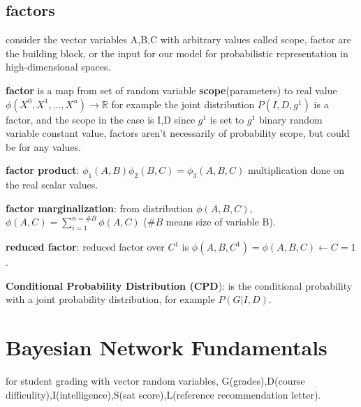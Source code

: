 \documentclass[4apaper,12pt]{book}
\begin{document}
\begin{description}
\begin{description}
      \subsection{factors}
      \begin{description}
      \item consider the vector variables A,B,C with arbitrary values called scope, factor are the building block, or the input for our model for probabilistic representation in high-dimensional spaces.
      \item \textbf{factor} is a map from set of random variable \textbf{scope}(parameters) to real value $\phi(X^0,X^1,...,X^n) \rightarrow \mathbb{R}$ for example the joint distribution $P(I,D,g^1)$ is a factor, and the scope in the case is I,D since $g^1$ is set to $g^1$ binary random variable constant value, factors aren't necessarily of probability scope, but could be for any values.
      \item \textbf{factor product}:  $\phi_1{(A,B)} \phi_2{(B,C)}=\phi_3{(A,B,C)}$ multiplication done on the real scalar values.
      \item \textbf{factor marginalization}: from distribution $\phi{(A,B,C)}$, $\phi{(A,C)}=\sum_{i=1}^{n={\#B}}\phi(A,C)$ ($\#B$ means size of variable B).
      \item \textbf{reduced factor}: reduced factor over $C^1$ is $\phi{(A,B,C^1)}=\phi{(A,B,C)} \leftarrow {C=1}$.
      \end{description}
    \item \textbf{Conditional Probability Distribution (CPD}): is the conditional probability with a joint probability distribution, for example $P(G|I,D)$.

    \end{description}
    \section{Bayesian Network Fundamentals}
    \begin{description}
    \item for student grading with vector random variables, G(grades),D(course difficulity),I(intelligence),S(sat score),L(reference recommendation letter).

\end{description}
\end{description}
\end{document}
